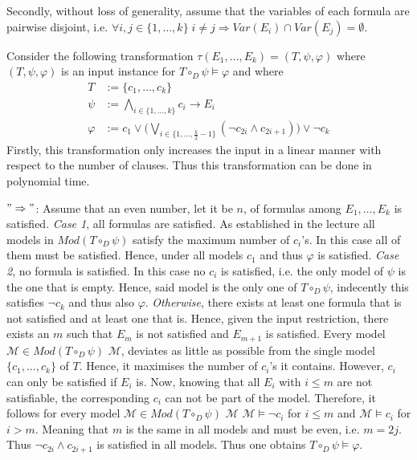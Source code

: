\documentclass[11pt,a4paper]{article}
\begin{document}
\begin{enumerate}
\begin{enumerate}[(a)]
Secondly, without loss of generality, assume that the variables of each formula are pairwise disjoint, i.e. $\forall i, j \in \{1, \dots, k\} \; i \neq j \Rightarrow \mathit{Var}(E_i) \cap \mathit{Var}(E_j)=\emptyset$.



Consider the following transformation $\tau(E_1, \dots, E_k)=(T, \psi, \varphi)$ where $(T, \psi, \varphi)$ is an input instance for $T \circ_D \psi \models \varphi$ and where 
\begin{equation*}
\begin{split}
T &:= \{c_1, \dots, c_k\} \\
\psi &:= \bigwedge_{i \in \{1, \dots, k\}} c_i \to E_i \\
\varphi &:=   c_1 \lor \big(\bigvee_{i \in \{1, \dots , \frac{k}{2}-1\}} (\neg c_{2i}   \land  c_{2i+1} )\big)   \lor \neg c_k 
\end{split}
\end{equation*}
Firstly, this transformation only increases the input in a linear manner with respect to the number of clauses. Thus this transformation can be done in polynomial time.

$"\Rightarrow"$: Assume that an even number, let it be $n$, of formulas among $E_1, \dots, E_k$ is satisfied. \emph{Case 1}, all formulas are satisfied. As established in the lecture all models in $\mathit{Mod}(T \circ_D \psi)$ satisfy the maximum number of $c_i$'s. In this case all of them must be satisfied. Hence, under all models $c_1$ and thus $\varphi$ is satisfied.
 \emph{Case 2}, no formula is satisfied. In this case no $c_i$ is satisfied, i.e. the only model of $\psi$ is the one that is empty. Hence, said model is the only one of $T \circ_D \psi$, indecently this satisfies $\neg c_k$ and thus also $\varphi$.
\emph{Otherwise}, there exists at least one formula that is not satisfied and at least one that is. Hence, given the input restriction, there exists an $m$ such that $E_{m}$ is not satisfied and $E_{m+1}$ is satisfied. 
Every model $\mathcal{M} \in \mathit{Mod}(T \circ_D \psi)$ $\mathcal{M}$, deviates as little as possible from the single model $\{c_1, \dots, c_k\} $ of $T$. Hence, it maximises the number of $c_i$'s it contains. However, $c_i$ can only be satisfied if $E_i$ is. Now, knowing that all $E_i$ with $i \leq m$ are not satisfiable, the corresponding $c_i$ can not be part of the model. Therefore, it follows for every model $\mathcal{M} \in \mathit{Mod}(T \circ_D \psi)$ $\mathcal{M}$ $\mathcal{M} \models \neg c_i$ for $i \leq m$ and  $\mathcal{M} \models  c_i$ for $i>m$. Meaning that $m$ is the same in all models and must be even, i.e. $m = 2j$.  Thus  $\neg c_{2i}   \land  c_{2i+1} $ is satisfied in all models. Thus one obtains $T \circ_D \psi \models \varphi$.


\end{enumerate}
\end{enumerate}
\end{document}
